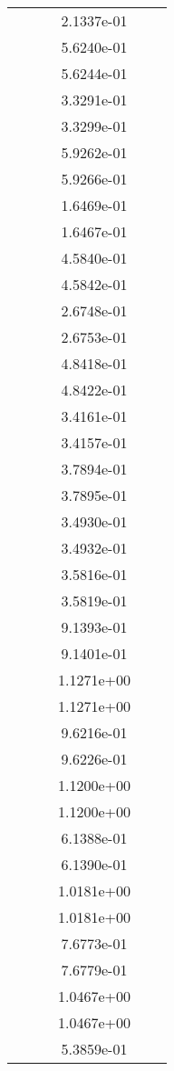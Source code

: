 \begin{xltabular}{\textwidth}{r|rS[table-format=1.3e+2]S[table-format=1.4e+2]S[table-format=1.4e+2]S[table-format=-1.5]}
&  &  & 2.1337e-01 & & \\
&  &  & 5.6240e-01 & & \\
&  &  & 5.6244e-01 & & \\
&  &  & 3.3291e-01 & & \\
&  &  & 3.3299e-01 & & \\
&  &  & 5.9262e-01 & & \\
&  &  & 5.9266e-01 & & \\
&  &  & 1.6469e-01 & & \\
&  &  & 1.6467e-01 & & \\
&  &  & 4.5840e-01 & & \\
&  &  & 4.5842e-01 & & \\
&  &  & 2.6748e-01 & & \\
&  &  & 2.6753e-01 & & \\
&  &  & 4.8418e-01 & & \\
&  &  & 4.8422e-01 & & \\
&  &  & 3.4161e-01 & & \\
&  &  & 3.4157e-01 & & \\
&  &  & 3.7894e-01 & & \\
&  &  & 3.7895e-01 & & \\
&  &  & 3.4930e-01 & & \\
&  &  & 3.4932e-01 & & \\
&  &  & 3.5816e-01 & & \\
&  &  & 3.5819e-01 & & \\
&  &  & 9.1393e-01 & & \\
&  &  & 9.1401e-01 & & \\
&  &  & 1.1271e+00 & & \\
&  &  & 1.1271e+00 & & \\
&  &  & 9.6216e-01 & & \\
&  &  & 9.6226e-01 & & \\
&  &  & 1.1200e+00 & & \\
&  &  & 1.1200e+00 & & \\
&  &  & 6.1388e-01 & & \\
&  &  & 6.1390e-01 & & \\
&  &  & 1.0181e+00 & & \\
&  &  & 1.0181e+00 & & \\
&  &  & 7.6773e-01 & & \\
&  &  & 7.6779e-01 & & \\
&  &  & 1.0467e+00 & & \\
&  &  & 1.0467e+00 & & \\
&  &  & 5.3859e-01 & & \\

\end{xltabular}
